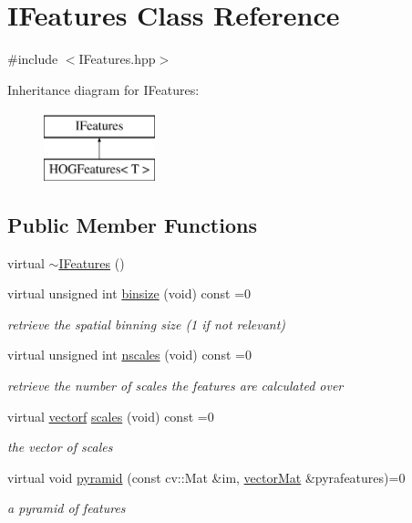 \hypertarget{classIFeatures}{\section{\-I\-Features \-Class \-Reference}
\label{classIFeatures}
}


{\ttfamily \#include $<$\-I\-Features.\-hpp$>$}

\-Inheritance diagram for \-I\-Features\-:\begin{figure}[H]
\begin{center}
\leavevmode
\includegraphics[height=2.000000cm]{classIFeatures}
\end{center}
\end{figure}
\subsection*{\-Public \-Member \-Functions}
\begin{DoxyCompactItemize}
\item 
virtual \hyperlink{classIFeatures_a7de8c9d6739ebd4504f9d033d71c2f42}{$\sim$\-I\-Features} ()
\item 
virtual unsigned int \hyperlink{classIFeatures_a62dd189aaf441de426fe1661d6306ac4}{binsize} (void) const =0
\begin{DoxyCompactList}\small\item\em retrieve the spatial binning size (1 if not relevant) \end{DoxyCompactList}\item 
virtual unsigned int \hyperlink{classIFeatures_a4d6964609c1c2137e0e14a3ac2f10ebc}{nscales} (void) const =0
\begin{DoxyCompactList}\small\item\em retrieve the number of scales the features are calculated over \end{DoxyCompactList}\item 
virtual \hyperlink{types_8hpp_a4da5db3ee9e284f719ef5764dbadffc8}{vectorf} \hyperlink{classIFeatures_ad02aea9fd29e438d25e1c7d68c508b9e}{scales} (void) const =0
\begin{DoxyCompactList}\small\item\em the vector of scales \end{DoxyCompactList}\item 
virtual void \hyperlink{classIFeatures_a0cd270503671145fae965c8d9fedc91a}{pyramid} (const cv\-::\-Mat \&im, \hyperlink{types_8hpp_a3207a7addcfa415d1c83622febcb1e9b}{vector\-Mat} \&pyrafeatures)=0
\begin{DoxyCompactList}\small\item\em a pyramid of features \end{DoxyCompactList}\end{DoxyCompactItemize}


